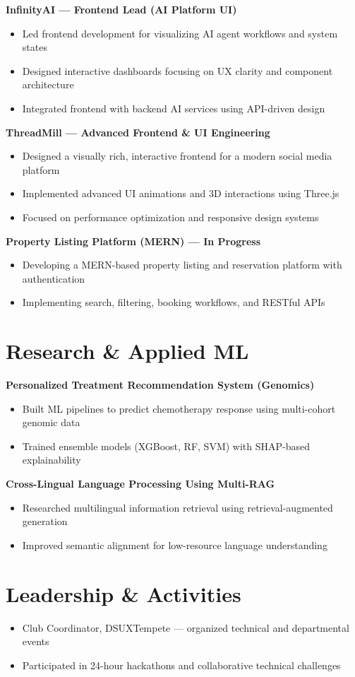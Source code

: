 \documentclass[11pt,a4paper]{article}
\begin{document}
\textbf{InfinityAI — Frontend Lead (AI Platform UI)}
\begin{itemize}
\item Led frontend development for visualizing AI agent workflows and system states
\item Designed interactive dashboards focusing on UX clarity and component architecture
\item Integrated frontend with backend AI services using API-driven design
\end{itemize}

\textbf{ThreadMill — Advanced Frontend \& UI Engineering}
\begin{itemize}
\item Designed a visually rich, interactive frontend for a modern social media platform
\item Implemented advanced UI animations and 3D interactions using Three.js
\item Focused on performance optimization and responsive design systems
\end{itemize}

\textbf{Property Listing Platform (MERN) — In Progress}
\begin{itemize}
\item Developing a MERN-based property listing and reservation platform with authentication
\item Implementing search, filtering, booking workflows, and RESTful APIs
\end{itemize}

\section*{Research \& Applied ML}

\textbf{Personalized Treatment Recommendation System (Genomics)}
\begin{itemize}
\item Built ML pipelines to predict chemotherapy response using multi-cohort genomic data
\item Trained ensemble models (XGBoost, RF, SVM) with SHAP-based explainability
\end{itemize}

\textbf{Cross-Lingual Language Processing Using Multi-RAG}
\begin{itemize}
\item Researched multilingual information retrieval using retrieval-augmented generation
\item Improved semantic alignment for low-resource language understanding
\end{itemize}

\section*{Leadership \& Activities}
\begin{itemize}
\item Club Coordinator, DSUXTempete — organized technical and departmental events
\item Participated in 24-hour hackathons and collaborative technical challenges
\end{itemize}
\end{document}
